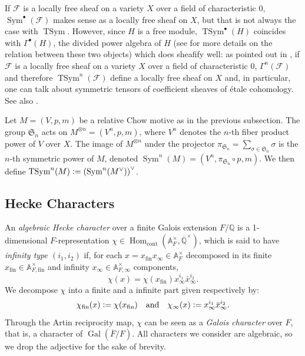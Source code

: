 \documentclass[a4paper]{amsart}
\numberwithin{equation}{section}
\theoremstyle{definition}
\newcommand{\Q}{\mathbb{Q}}
\newcommand{\A}{\mathbb{A}}
\newcommand{\defeq}{\vcentcolon=}
\DeclareMathOperator{\Hom}{Hom}
\DeclareMathOperator{\Gal}{Gal}
\DeclareMathOperator{\TSym}{TSym}
\DeclareMathOperator{\Sym}{Sym}
\newcommand{\cont}{\mathrm{cont}}
\begin{document}
If $\mathscr{F}$ is a locally free sheaf on a variety $X$ over a field of characteristic 0, $\Sym^{\bullet}(\mathscr{F})$ makes sense as a locally free sheaf on $X$, but that is not always the case with $\TSym$. However, since $H$ is a free module, $\TSym^{\bullet}(H)$ coincides with $\Gamma^{\bullet}(H)$, the divided power algebra of $H$ (see \cite{Lundkvist} for more details on the relation between these two objects) which does sheafify well: as pointed out in \cite[\S2.2]{KingsLoefflerZerbes.ERL}, if $\mathscr{F}$ is a locally free sheaf on a variety $X$ over a field of characteristic 0, $\Gamma^n(\mathscr{F})$ and therefore $\TSym^n(\mathscr{F})$ define a locally free sheaf on $X$ and, in particular, one can talk about symmetric tensors of coefficient sheaves of étale cohomology. See also \cite[\S 12.2.2]{Kings.TSym}.

Let $M=(V,p,m)$ be a relative Chow motive as in the previous subsection. The group $\mathfrak{S}_n$ acts on $M^{\otimes n}=(V^n,p,m)$, where $V^n$ denotes the $n$-th fiber product power of $V$ over $X$. The image of $M^{\otimes n}$ under the projector $\pi_{\mathfrak{S}_n}=\sum_{\sigma\in\mathfrak{S}_n}\sigma$ is the $n$-th symmetric power of $M$, denoted $\Sym^n(M)=(V^n,\pi_{\mathfrak{S}_n}\circ p,m)$. We then define $\TSym^n(M)\defeq\left(\Sym^n(M^\vee)\right)^\vee$.

\subsection{Hecke Characters}\label{subsec.HeckeCharacters}
An \textit{algebraic Hecke character} over a finite Galois extension $F/\Q$ is a 1-dimensional $F$-representation $\chi\in\Hom_{\cont}(\A_{F}^\times,\overline{\Q}^\times)$, which is said to have \textit{infinity type $(i_1,i_2)$} if, for each $x=x_{\mathrm{fin}}x_\infty\in\A^\times_F$ decomposed in its finite $x_{\mathrm{fin}}\in\A^\times_{F,\mathrm{fin}}$ and infinity $x_\infty\in\A^\times_{F,\infty}$ components, \[\chi(x)=\chi(x_{\mathrm{fin}})x_\infty^{i_1}\bar{x}_\infty^{i_2}.\]
We decompose $\chi$ into a finite and a infinite part given respectively by: \[\chi_{\mathrm{fin}}(x)\defeq\chi(x_\mathrm{fin})\hspace{10pt}\text{and}\hspace{10pt}\chi_\infty(x)\defeq x_\infty^{i_1}\bar{x}_\infty^{i_2}.\] Through the Artin reciprocity map, $\chi$ can be seen as a \textit{Galois character} over $F$, that is, a character of $\Gal(\overline{F}/F)$. All characters we consider are algebraic, so we drop the adjective for the sake of brevity.
\end{document}
